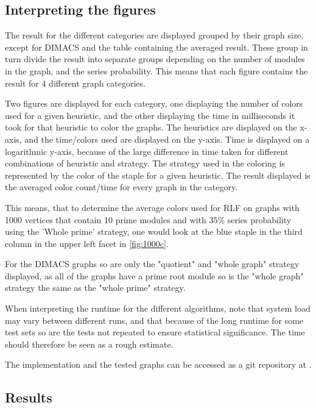 \documentclass[a4paper]{article}
\begin{document}
\subsection{Interpreting the figures}

The result for the different categories are displayed grouped by their graph
size, except for DIMACS and the table containing the averaged result. These
group in turn divide the result into separate groups depending on the number of
modules in the graph, and the series probability. This means that each figure
contains the result for 4 different graph categories.

Two figures are displayed for each category, one displaying the number of
colors used for a given heuristic, and the other displaying the time in
milliseconds it took for that heuristic to color the graphs. The heuristics are
displayed on the x-axis, and the time/colors used are displayed on the y-axis.
Time is displayed on a logarithmic y-axis, because of the large difference in
time taken for different combinations of heuristic and strategy. The strategy
used in the coloring is represented by the color of the staple for a given
heuristic. The result displayed is the averaged color count/time for every
graph in the category.

This means, that to determine the average colors used for RLF on graphs with
1000 vertices that contain 10 prime modules and with 35\% series probability using
the 'Whole prime' strategy, one would look at the blue staple in the third
column in the upper left facet in \autoref{fig:1000c}.

For the DIMACS graphs so are only the "quotient" and "whole graph" strategy displayed,
as all of the graphs have a prime root module so is the "whole graph" strategy
the same as the "whole prime" strategy.

When interpreting the runtime for the different algorithms, note
that system load may vary between different runs, and that because of
the long runtime for some test sets so are the tests not repeated to ensure
statistical significance. The time should therefore be seen as a rough
estimate.

The implementation and the tested graphs can be accessed as a git repository 
at \cite{BCGithub}.

\subsection{Results}
\newpage
\end{document}
